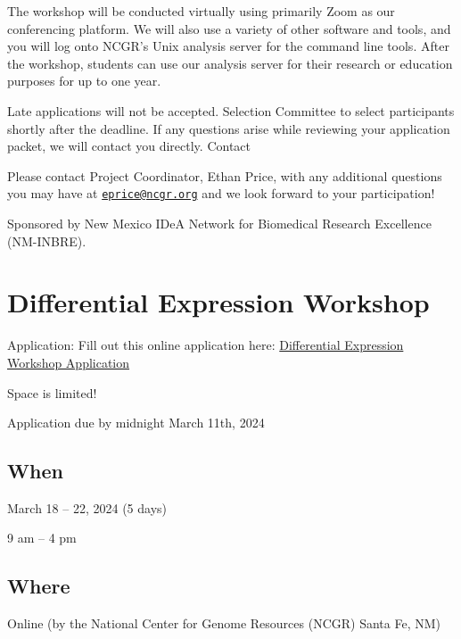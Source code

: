 \documentclass[
]{book}
\begin{document}
The workshop will be conducted virtually using primarily Zoom as our conferencing platform. We will also use a variety of other software and tools, and you will log onto NCGR's Unix analysis server for the command line tools. After the workshop, students can use our analysis server for their research or education purposes for up to one year.

Late applications will not be accepted. Selection Committee to select participants shortly after the deadline. If any questions arise while reviewing your application packet, we will contact you directly.
Contact

Please contact Project Coordinator, Ethan Price, with any additional questions you may have at \href{mailto:eprice@ncgr.org}{\nolinkurl{eprice@ncgr.org}} and we look forward to your participation!

Sponsored by New Mexico IDeA Network for Biomedical Research Excellence (NM-INBRE).

\hypertarget{differential-expression-workshop}{%
\chapter*{Differential Expression Workshop}\label{differential-expression-workshop}}

Application: Fill out this online application here:
\href{https://docs.google.com/forms/d/e/1FAIpQLScpoKxE0yAnCK3yOl5hBde7MtOWCOeXYxvjBfWyDcA9hHDGrw/viewform}{Differential Expression Workshop Application}

Space is limited!

Application due by midnight March 11th, 2024

\hypertarget{when-4}{%
\section*{When}\label{when-4}}

March 18 -- 22, 2024 (5 days)

9 am -- 4 pm

\hypertarget{where-3}{%
\section*{Where}\label{where-3}}

Online (by the National Center for Genome Resources (NCGR) Santa Fe, NM)
\end{document}
